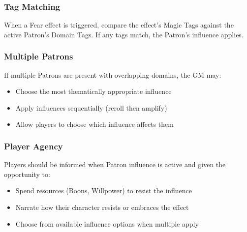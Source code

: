 \subsubsection{Tag Matching}
When a Fear effect is triggered, compare the effect's Magic Tags against the active Patron's Domain Tags. If any tags match, the Patron's influence applies.

\subsubsection{Multiple Patrons}
If multiple Patrons are present with overlapping domains, the GM may:
\begin{itemize}
  \item Choose the most thematically appropriate influence
  \item Apply influences sequentially (reroll then amplify)
  \item Allow players to choose which influence affects them
\end{itemize}

\subsubsection{Player Agency}
Players should be informed when Patron influence is active and given the opportunity to:
\begin{itemize}
  \item Spend resources (Boons, Willpower) to resist the influence
  \item Narrate how their character resists or embraces the effect
  \item Choose from available influence options when multiple apply
\end{itemize}
